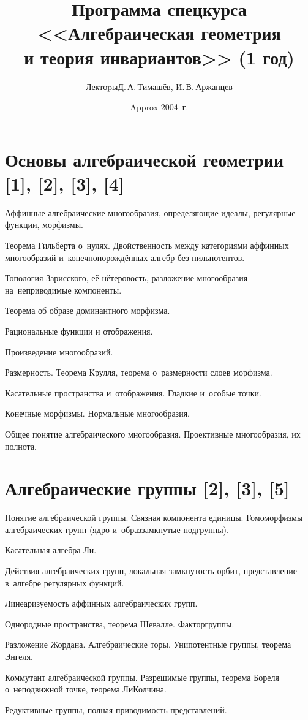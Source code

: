 \documentclass[a4paper]{article}
\title{Программа спецкурса <<Алгебраическая геометрия\\и теория инвариантов>> (1 год)}
\author{Лектоpы\т Д.\,А.\,Тимашёв, И.\,В.\,Аржанцев}
\date{Approx 2004~г.}
\begin{document}
\maketitle

\section*{Основы алгебраической геометрии [1], [2], [3], [4]}
\begin{items}{-2}
\item Аффинные алгебраические многообразия, определяющие идеалы, регулярные функции, морфизмы.
\item Теорема Гильберта о~нулях. Двойственность между категориями аффинных многообразий и~конечнопорождённых алгебр без нильпотентов.
\item Топология Зарисского, её нётеровость, разложение многообразия на~неприводимые компоненты.
\item Теорема об образе доминантного морфизма.
\item Рациональные функции и отображения.
\item Произведение многообразий.
\item Размерность. Теорема Крулля, теорема о~размерности слоев морфизма.
\item Касательные пространства и~отображения. Гладкие и~особые точки.
\item Конечные морфизмы. Нормальные многообразия.
\item Общее понятие алгебраического многообразия. Проективные многообразия, их полнота.
\end{items}

\section*{Алгебраические группы [2], [3], [5]}
\begin{items}{-2}
\item Понятие алгебраической группы. Связная компонента единицы. Гомоморфизмы
алгебраических групп (ядро и~образ\т замкнутые подгруппы).
\item Касательная алгебра Ли.
\item Действия алгебраических групп, локальная замкнутость орбит, представление в~алгебре регулярных функций.
\item Линеаризуемость аффинных алгебраических групп.
\item Однородные пространства, теорема Шевалле. Факторгруппы.
\item Разложение Жордана. Алгебраические торы. Унипотентные группы, теорема Энгеля.
\item Коммутант алгебраической группы. Разрешимые группы, теорема Бореля о~неподвижной точке, теорема Ли\ч Колчина.
\item Редуктивные группы, полная приводимость представлений.
\end{items}
\end{document}
